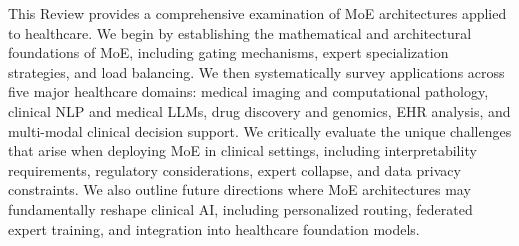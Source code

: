 This Review provides a comprehensive examination of MoE architectures applied to healthcare. We begin by establishing the mathematical and architectural foundations of MoE, including gating mechanisms, expert specialization strategies, and load balancing. We then systematically survey applications across five major healthcare domains: medical imaging and computational pathology, clinical NLP and medical LLMs, drug discovery and genomics, EHR analysis, and multi-modal clinical decision support. We critically evaluate the unique challenges that arise when deploying MoE in clinical settings, including interpretability requirements, regulatory considerations, expert collapse, and data privacy constraints. We also outline future directions where MoE architectures may fundamentally reshape clinical AI, including personalized routing, federated expert training, and integration into healthcare foundation models.
